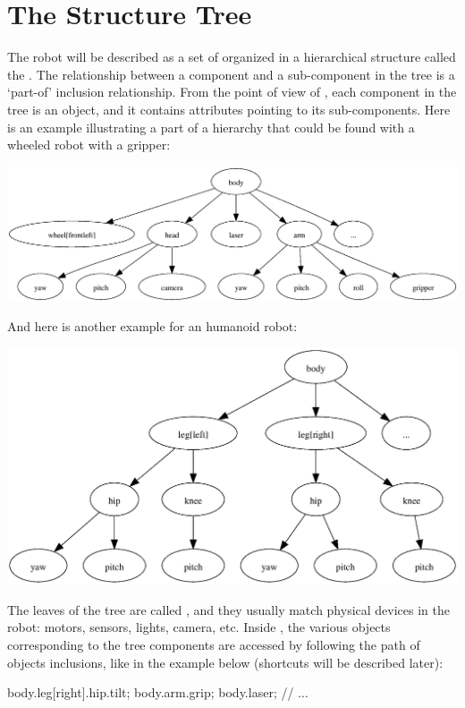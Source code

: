 \section{The Structure Tree}

The robot will be described as a set of  organized in a
hierarchical structure called the . The relationship
between a component and a sub-component in the tree is a `part-of' inclusion
relationship. From the point of view of \urbi, each component in the tree is
an object, and it contains attributes pointing to its sub-components. Here
is an example illustrating a part of a hierarchy that could be found with a
wheeled robot with a gripper:

\begin{center}
  \includegraphics[width=.8\linewidth]{img/structure-tree-wheeled}
\end{center}

And here is another example for an humanoid robot:

\begin{center}
  \includegraphics[width=.8\linewidth]{img/structure-tree-humanoid}
\end{center}

The leaves of the tree are called , and they usually match
physical devices in the robot: motors, sensors, lights, camera, etc. Inside
\urbi, the various objects corresponding to the tree components are accessed
by following the path of objects inclusions, like in the example below
(shortcuts will be described later):

\begin{urbiunchecked}
body.leg[right].hip.tilt;
body.arm.grip;
body.laser;
// ...
\end{urbiunchecked}


